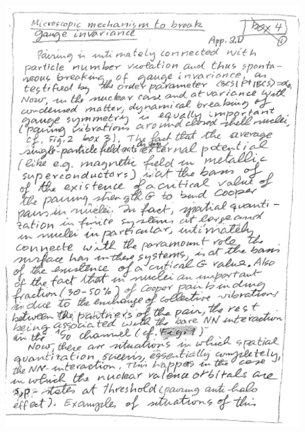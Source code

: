 \documentclass[a4paper,11pt]{book}
\numberwithin{equation}{section}
\numberwithin{figure}{section}
\numberwithin{table}{section}
\begin{document}
\begin{figure}
\centerline{\includegraphics*[width=\textwidth,angle=0]{figs/box4_1.pdf}}
\end{figure}
\end{document}
